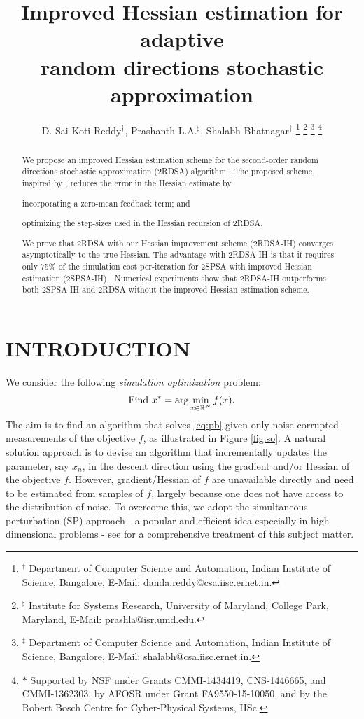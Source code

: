 \documentclass[letterpaper, 10 pt, conference]{ieeeconf}  %
\title{\LARGE \bf
Improved Hessian estimation for adaptive \\random directions stochastic approximation
}
\author{D. Sai Koti Reddy$^\dagger$, Prashanth L.A.$^\sharp$, Shalabh Bhatnagar$^\ddag$
\thanks{
$^\dagger$ Department of Computer Science and Automation,
Indian Institute of Science, Bangalore,
E-Mail: danda.reddy@csa.iisc.ernet.in.}
\thanks{$^\sharp$ Institute for Systems Research, University of Maryland, College Park, Maryland,
E-Mail: prashla@isr.umd.edu.}
\thanks{$^\ddag$ Department of Computer Science and Automation,
Indian Institute of Science, Bangalore,
E-Mail: shalabh@csa.iisc.ernet.in.}
\thanks{$\ast$ Supported by NSF under Grants CMMI-1434419, CNS-1446665,
and CMMI-1362303,  by AFOSR under Grant FA9550-15-10050, and
by the Robert Bosch Centre for Cyber-Physical Systems, IISc.
}
}
\begin{document}
\maketitle
\thispagestyle{empty}
\pagestyle{empty}


\begin{abstract}
We propose an improved Hessian estimation scheme for the second-order random directions stochastic approximation (2RDSA) algorithm \cite{prashanth2015rdsa}. The proposed scheme, inspired by \cite{spall-jacobian}, reduces the error in the Hessian estimate by 
\begin{inparaenum}[\bfseries (i)]
	\item incorporating a zero-mean feedback term; and
	\item optimizing the step-sizes used in the Hessian recursion of 2RDSA.
\end{inparaenum}
We prove that 2RDSA with our Hessian improvement scheme (2RDSA-IH) converges asymptotically to the true Hessian.
The advantage with 2RDSA-IH is that it requires only 75\% of the simulation cost per-iteration for 2SPSA with improved Hessian estimation (2SPSA-IH) \cite{spall-jacobian}.
Numerical experiments show that 2RDSA-IH outperforms both 2SPSA-IH and 2RDSA without the improved Hessian estimation scheme.
\end{abstract}


\section{INTRODUCTION}
\noindent We consider the following \textit{simulation optimization} problem:
\begin{align}
\mbox{Find } x^* = \arg\min_{x \in \mathbb{R}^N} f(x). \label{eq:pb}
\end{align}
The aim is to find an algorithm that solves \eqref{eq:pb} given only noise-corrupted measurements of the objective $f$, as illustrated in Figure \ref{fig:so}.
A natural solution approach is to devise an algorithm that incrementally updates the parameter, say $x_n$, in the descent direction using the gradient and/or Hessian of the objective $f$. However, gradient/Hessian of $f$ are unavailable directly and need to be estimated from samples of $f$, largely because one does not have access to the distribution of noise.
To overcome this, we adopt the simultaneous perturbation (SP) approach - a popular and efficient idea especially in high dimensional problems - see \cite{bhatnagar-book} for a comprehensive treatment of this subject matter. 
\end{document}

